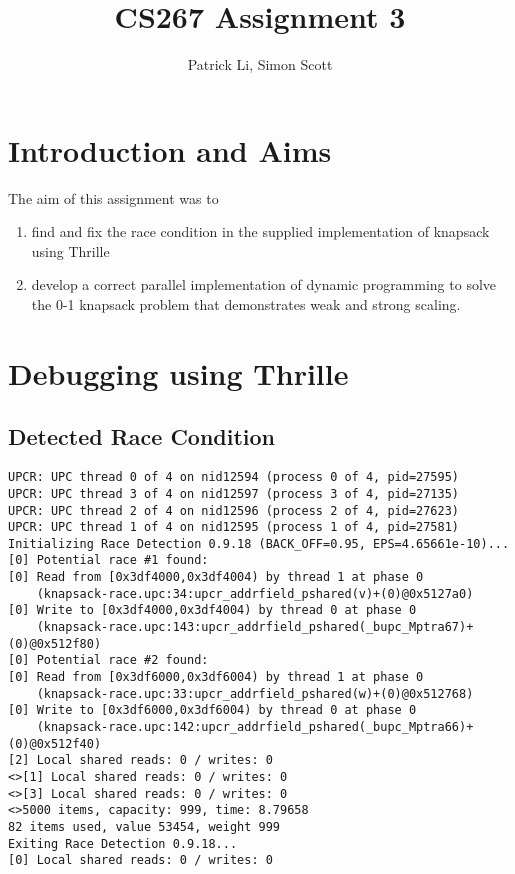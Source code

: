 \documentclass[11pt]{article} %
\title{CS267 Assignment 3}
\author{Patrick Li, Simon Scott}
\begin{document}
\maketitle
\parskip 7.2pt

\section{Introduction and Aims}
The aim of this assignment was to 
\begin{enumerate}
  \item find and fix the race condition in the supplied implementation of knapsack using Thrille
  \item develop a correct parallel implementation of dynamic programming to solve the 0-1 knapsack problem that demonstrates weak and strong scaling.
\end{enumerate}

\section{Debugging using Thrille}
\subsection{Detected Race Condition}
{\tiny
\begin{lstlisting}
UPCR: UPC thread 0 of 4 on nid12594 (process 0 of 4, pid=27595)
UPCR: UPC thread 3 of 4 on nid12597 (process 3 of 4, pid=27135)
UPCR: UPC thread 2 of 4 on nid12596 (process 2 of 4, pid=27623)
UPCR: UPC thread 1 of 4 on nid12595 (process 1 of 4, pid=27581)
Initializing Race Detection 0.9.18 (BACK_OFF=0.95, EPS=4.65661e-10)...
[0] Potential race #1 found:
[0] Read from [0x3df4000,0x3df4004) by thread 1 at phase 0 
    (knapsack-race.upc:34:upcr_addrfield_pshared(v)+(0)@0x5127a0)
[0] Write to [0x3df4000,0x3df4004) by thread 0 at phase 0 
    (knapsack-race.upc:143:upcr_addrfield_pshared(_bupc_Mptra67)+(0)@0x512f80)
[0] Potential race #2 found:
[0] Read from [0x3df6000,0x3df6004) by thread 1 at phase 0 
    (knapsack-race.upc:33:upcr_addrfield_pshared(w)+(0)@0x512768)
[0] Write to [0x3df6000,0x3df6004) by thread 0 at phase 0 
    (knapsack-race.upc:142:upcr_addrfield_pshared(_bupc_Mptra66)+(0)@0x512f40)
[2] Local shared reads: 0 / writes: 0
<>[1] Local shared reads: 0 / writes: 0
<>[3] Local shared reads: 0 / writes: 0
<>5000 items, capacity: 999, time: 8.79658
82 items used, value 53454, weight 999
Exiting Race Detection 0.9.18...
[0] Local shared reads: 0 / writes: 0
\end{lstlisting}
}
\end{document}
